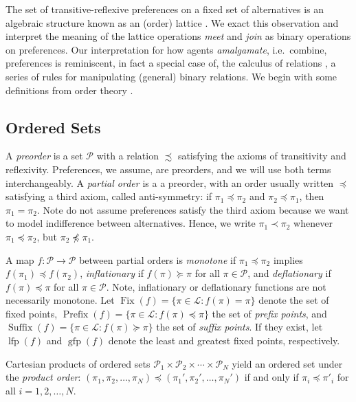 \documentclass[conference]{ieeeconf}
\renewcommand{\P}{\mathcal{P}}
\renewcommand{\L}{\mathcal{L}}
\DeclareMathOperator{\Fix}{Fix}
\DeclareMathOperator{\Pre}{Prefix}
\DeclareMathOperator{\Post}{Suffix}
\DeclareMathOperator{\lfp}{lfp}
\DeclareMathOperator{\gfp}{gfp}
\newtheorem{lemma}{Lemma}
\begin{document}
The set of transitive-reflexive preferences on a fixed set of alternatives is an algebraic structure known as an (order) lattice \cite{birkhoff1940}. We exact this observation and interpret the meaning of the lattice operations \emph{meet} and \emph{join} as binary operations on preferences. Our interpretation for how agents \emph{amalgamate}, i.e.~combine, preferences is reminiscent, in fact a special case of, the calculus of relations \cite{tarski1941}, a series of rules for manipulating (general) binary relations. We begin with some definitions from order theory \cite{roman2008}.

\subsection{Ordered Sets}

A \emph{preorder} is a set $\P$ with a relation $\precsim$ satisfying the axioms of transitivity and reflexivity. Preferences, we assume, are preorders, and we will use both terms interchangeably. A \emph{partial order} is a a preorder, with an order usually written $\preceq$ satisfying a third axiom, called anti-symmetry: if $\pi_1 \preceq \pi_2$ and $\pi_2 \preceq \pi_1$, then $\pi_1 = \pi_2$. Note do not assume preferences satisfy the third axiom because we want to model indifference between alternatives. Hence, we write $\pi_1 \prec \pi_2$ whenever $\pi_1 \preceq \pi_2$, but $\pi_2 \not \preceq \pi_1$.

A map $f: \P \to \P$ between partial orders is \emph{monotone} if $\pi_1 \preceq \pi_2$ implies $f(\pi_1) \preceq f(\pi_2)$, \emph{inflationary} if $f(\pi) \succeq \pi$ for all $\pi \in \P$, and \emph{deflationary} if $f(\pi) \preceq \pi$ for all $\pi \in \P$. Note, inflationary or deflationary functions are not necessarily monotone. Let $\Fix(f) = \{ \pi \in \L: f(\pi) = \pi \}$ denote the set of fixed points, $\Pre(f) = \{ \pi \in \L : f(\pi) \preceq \pi\}$ the set of \emph{prefix points}, and $\Post(f) =\{ \pi \in \L : f(\pi) \succeq \pi\}$ the set of \emph{suffix points}. If they exist, let $\lfp(f)$ and $\gfp(f)$ denote the least and greatest fixed points, respectively.

Cartesian products of ordered sets $\P_1 \times \P_2 \times \cdots \times \P_N$ yield an ordered set under the \emph{product order}: $(\pi_1, \pi_2, \dots, \pi_N) \preceq (\pi_1', \pi_2', \dots, \pi_N')$ if and only if $\pi_i \preceq \pi'_i$ for all $i = 1,2,\dots, N$. 

\end{document}
